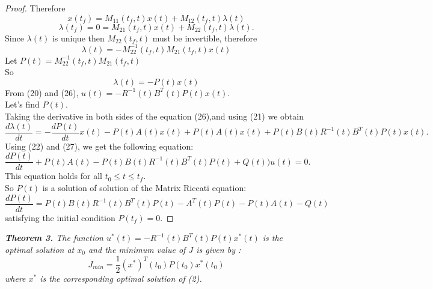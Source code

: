 \documentclass[12pt]{article}
\begin{document}
\begin{proof}
Therefore 
$$x(t_f)=M_{11}(t_f,t)x(t)+M_{12}(t_f,t)\lambda(t)$$
          $$\lambda(t_f)=0=M_{21}(t_f,t)x(t)+M_{22}(t_f,t)\lambda(t).$$
Since $\lambda(t)$ is unique  then  $M_{22}(t_f,t)$ must be  invertible,  
 therefore
$$\lambda(t)=-M_{22}^{-1}(t_f,t)M_{21}(t_f,t)x(t)$$
Let $P(t)=M_{22}^{-1}(t_f,t)M_{21}(t_f,t)$ \\
So 
\begin{equation}
    \lambda(t)=-P(t)x(t) 
\end{equation}
From (20) and (26), $u(t)=-R^{-1}(t)B^T(t)P(t)x(t).$\\
Let's find $P(t)$.\\
Taking the derivative in both sides of the equation (26),and using (21) we obtain
\begin{equation}
    \frac{d\lambda(t)}{dt}=-\frac{dP(t)}{dt}x(t)-P(t)A(t)x(t)+P(t)A(t)x(t)+P(t)B(t)R^{-1}(t)B^T(t)P(t)x(t).
\end{equation}
Using (22) and (27), we get the following equation:
\begin{equation}
    \frac{dP(t)}{dt}+P(t)A(t)-P(t)B(t)R^{-1}(t)B^T(t)P(t)+Q(t))u(t)=0.
\end{equation}
This equation holds for all $t_0\leq t\leq t_f$.\\
So $P(t)$ is a solution  of solution of the Matrix Riccati equation:
\begin{equation}
    \frac{dP(t)}{dt}=P(t)B(t)R^{-1}(t)B^T(t)P(t)-A^T(t)P(t)-P(t)A(t)-Q(t)
\end{equation}
satisfying the initial condition $P(t_f)=0.$
\end{proof}

\textit{{\bf Theorem 3.}
    The  function $u^*(t)=-R^{-1}(t)B^T(t)P(t)x^*(t)$
is the optimal solution at $x_0$ and the minimum value of $J$ is given
 by : $$J_{min}=\frac{1}{2}(x^*)^T(t_0)P(t_0)x^*(t_0)$$ 
 where $x^*$ is the corresponding optimal solution of (2).}
\end{document}
